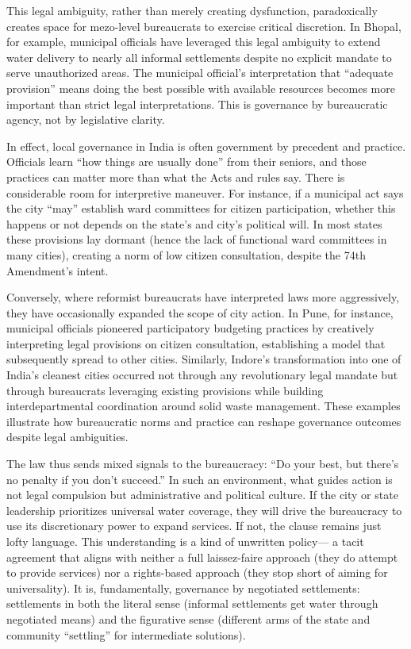 This legal ambiguity, rather than merely creating dysfunction, paradoxically creates space for mezo-level bureaucrats to exercise critical discretion. In Bhopal, for example, municipal officials have leveraged this legal ambiguity to extend water delivery to nearly all informal settlements despite no explicit mandate to serve unauthorized areas. The municipal official's interpretation that ``adequate provision'' means doing the best possible with available resources becomes more important than strict legal interpretations. This is governance by bureaucratic agency, not by legislative clarity.

In effect, local governance in India is often government by precedent and practice. Officials learn ``how things are usually done'' from their seniors, and those practices can matter more than what the Acts and rules say. There is considerable room for interpretive maneuver. For instance, if a municipal act says the city ``may'' establish ward committees for citizen participation, whether this happens or not depends on the state's and city's political will. In most states these provisions lay dormant (hence the lack of functional ward committees in many cities), creating a norm of low citizen consultation, despite the 74th Amendment's intent.

Conversely, where reformist bureaucrats have interpreted laws more aggressively, they have occasionally expanded the scope of city action. In Pune, for instance, municipal officials pioneered participatory budgeting practices by creatively interpreting legal provisions on citizen consultation, establishing a model that subsequently spread to other cities. Similarly, Indore's transformation into one of India's cleanest cities occurred not through any revolutionary legal mandate but through bureaucrats leveraging existing provisions while building interdepartmental coordination around solid waste management. These examples illustrate how bureaucratic norms and practice can reshape governance outcomes despite legal ambiguities.

The law thus sends mixed signals to the bureaucracy: ``Do your best, but there's no penalty if you don't succeed.'' In such an environment, what guides action is not legal compulsion but administrative and political culture. If the city or state leadership prioritizes universal water coverage, they will drive the bureaucracy to use its discretionary power to expand services. If not, the clause remains just lofty language. This understanding is a kind of unwritten policy— a tacit agreement that aligns with neither a full laissez-faire approach (they do attempt to provide services) nor a rights-based approach (they stop short of aiming for universality). It is, fundamentally, governance by negotiated settlements: settlements in both the literal sense (informal settlements get water through negotiated means) and the figurative sense (different arms of the state and community ``settling'' for intermediate solutions).

